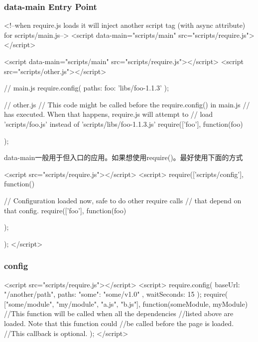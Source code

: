 \subsubsection{data-main Entry Point}

\begin{HTML5}
<!--when require.js loads it will inject another script tag
    (with async attribute) for scripts/main.js-->
<script data-main="scripts/main" src="scripts/require.js"></script>
\end{HTML5}

\begin{HTML5}
<script data-main="scripts/main" src="scripts/require.js"></script>
<script src="scripts/other.js"></script>

// main.js
require.config({
    paths: {
        foo: 'libs/foo-1.1.3'
    }
});

// other.js
// This code might be called before the require.config() in main.js
// has executed. When that happens, require.js will attempt to
// load 'scripts/foo.js' instead of 'scripts/libs/foo-1.1.3.js'
require(['foo'], function(foo) {

});
\end{HTML5}

data-main一般用于但入口的应用。如果想使用require()。最好使用下面的方式
\begin{HTML5}
<script src="scripts/require.js"></script>
<script>
require(['scripts/config'], function() {
    // Configuration loaded now, safe to do other require calls
    // that depend on that config.
    require(['foo'], function(foo) {

    });
});
</script>
\end{HTML5}

\subsubsection{config}

\begin{HTML5}
<script src="scripts/require.js"></script>
<script>
  require.config({
    baseUrl: "/another/path",
    paths: {
        "some": "some/v1.0"
    },
    waitSeconds: 15
  });
  require( ["some/module", "my/module", "a.js", "b.js"],
    function(someModule,    myModule) {
        //This function will be called when all the dependencies
        //listed above are loaded. Note that this function could
        //be called before the page is loaded.
        //This callback is optional.
    }
  );
</script>
\end{HTML5}

